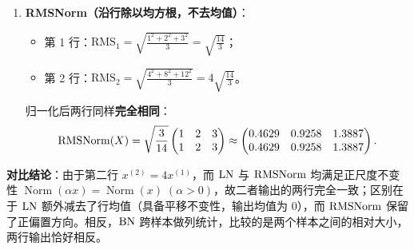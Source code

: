 \begin{enumerate}[label=(\arabic*), leftmargin=1.8em]
  \item \textbf{RMSNorm（沿行除以均方根，不去均值）}：
  \begin{itemize}
    \item 第 1 行：$\mathrm{RMS}_1 = \sqrt{\frac{1^2 + 2^2 + 3^2}{3}} = \sqrt{\frac{14}{3}}$；
    \item 第 2 行：$\mathrm{RMS}_2 = \sqrt{\frac{4^2 + 8^2 + 12^2}{3}} = 4\sqrt{\frac{14}{3}}$。
  \end{itemize}
  归一化后两行同样\textbf{完全相同}：
  \[
    \operatorname{RMSNorm}(X) = \sqrt{\frac{3}{14}}\begin{pmatrix} 1 & 2 & 3 \\ 1 & 2 & 3 \end{pmatrix}
    \approx \begin{pmatrix}
      0.4629 & 0.9258 & 1.3887 \\
      0.4629 & 0.9258 & 1.3887
    \end{pmatrix}.
  \]
\end{enumerate}
\textbf{对比结论}：由于第二行 $x^{(2)} = 4 x^{(1)}$，而 $\operatorname{LN}$ 与 $\operatorname{RMSNorm}$ 均满足正尺度不变性 $\operatorname{Norm}(\alpha x) = \operatorname{Norm}(x)\;(\alpha > 0)$，故二者输出的两行完全一致；区别在于 $\operatorname{LN}$ 额外减去了行均值（具备平移不变性，输出均值为 $0$），而 $\operatorname{RMSNorm}$ 保留了正偏置方向。相反，$\operatorname{BN}$ 跨样本做列统计，比较的是两个样本之间的相对大小，两行输出恰好相反。

